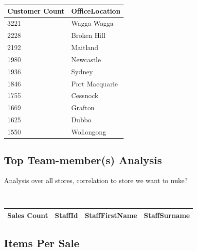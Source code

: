 \documentclass{article}
\begin{document}
            \begin{table}[H]
                \centering
                \begin{tabular}{|l|l|}
                \hline
                Customer Count & OfficeLocation \\ \hline
                3221           & Wagga Wagga    \\ \hline
                2228           & Broken Hill    \\ \hline
                2192           & Maitland       \\ \hline
                1980           & Newcastle      \\ \hline
                1936           & Sydney         \\ \hline
                1846           & Port Macquarie \\ \hline
                1755           & Cessnock       \\ \hline
                1669           & Grafton        \\ \hline
                1625           & Dubbo          \\ \hline
                1550           & Wollongong     \\ \hline
                \end{tabular}
                \end{table}

            \subsection{Top Team-member(s) Analysis}
                Analysis over all stores, correlation to store we want to nuke?

                \begin{lstlisting}
                   
                \end{lstlisting}

                \begin{table}[H]
                    \centering
                    \begin{tabular}{|l|l|l|l|}
                    \hline
                    Sales Count & StaffId & StaffFirstName & StaffSurname \\ \hline
                    \end{tabular}
                    \end{table}           
                    
            \subsection{Items Per Sale}
\end{document}
